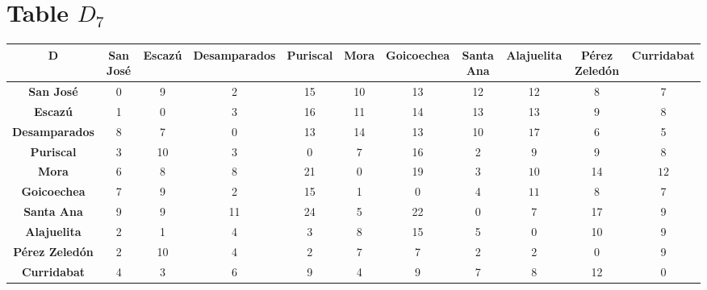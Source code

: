 \documentclass{article}
\begin{document}
\section{Table $D_{7}$}
\begin{center}
    \begin{tabular}{|c||c|c|c|c|c|c|c|c|c|c|}
        \hline
        \textbf{D} & \textbf{San José} & \textbf{Escazú} & \textbf{Desamparados} & \textbf{Puriscal} & \textbf{Mora} & \textbf{Goicoechea} & \textbf{Santa Ana} & \textbf{Alajuelita} & \textbf{Pérez Zeledón} & \textbf{Curridabat} \\
        \hline
        \hline
        \textbf{San José}& 0 & 9 & 2 & 15 & 10 & 13 & 12 & 12 & 8 & 7 \\
        \hline
        \textbf{Escazú}& 1 & 0 & 3 & 16 & 11 & 14 & 13 & 13 & 9 & 8 \\
        \hline
        \textbf{Desamparados}& 8 & 7 & 0 & 13 & 14 & 13 & 10 & \cellcolor[HTML]{D74894}$17$ & 6 & 5 \\
        \hline
        \textbf{Puriscal}& 3 & 10 & 3 & 0 & \cellcolor[HTML]{D74894}$7$ & 16 & 2 & \cellcolor[HTML]{D74894}$9$ & 9 & 8 \\
        \hline
        \textbf{Mora}& 6 & 8 & 8 & 21 & 0 & 19 & 3 & \cellcolor[HTML]{D74894}$10$ & 14 & \cellcolor[HTML]{D74894}$12$ \\
        \hline
        \textbf{Goicoechea}& 7 & 9 & 2 & 15 & 1 & 0 & 4 & \cellcolor[HTML]{D74894}$11$ & 8 & 7 \\
        \hline
        \textbf{Santa Ana}& 9 & 9 & 11 & 24 & 5 & 22 & 0 & 7 & 17 & 9 \\
        \hline
        \textbf{Alajuelita}& 2 & 1 & 4 & 3 & 8 & 15 & 5 & 0 & 10 & 9 \\
        \hline
        \textbf{Pérez Zeledón}& 2 & 10 & 4 & 2 & \cellcolor[HTML]{D74894}$7$ & 7 & 2 & 2 & 0 & 9 \\
        \hline
        \textbf{Curridabat}& 4 & 3 & 6 & 9 & 4 & 9 & 7 & 8 & 12 & 0 \\
        \hline
    \end{tabular}
\end{center}
\end{document}
